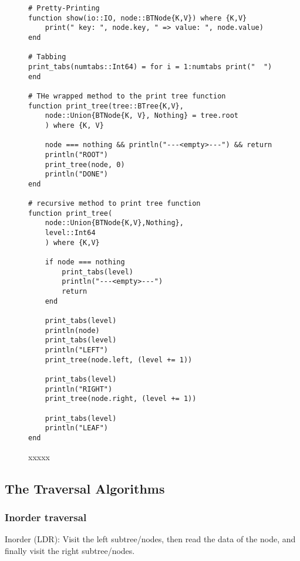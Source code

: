 \documentclass[a4paper, 11pt]{article}
\begin{document}
    \begin{figure}[H]
        \centering
    \begin{verbatim}
# Pretty-Printing
function show(io::IO, node::BTNode{K,V}) where {K,V}
    print(" key: ", node.key, " => value: ", node.value)
end

# Tabbing
print_tabs(numtabs::Int64) = for i = 1:numtabs print("  ") end

# THe wrapped method to the print tree function
function print_tree(tree::BTree{K,V}, 
    node::Union{BTNode{K, V}, Nothing} = tree.root
    ) where {K, V}

    node === nothing && println("---<empty>---") && return
    println("ROOT")
    print_tree(node, 0)
    println("DONE")
end

# recursive method to print tree function
function print_tree(
    node::Union{BTNode{K,V},Nothing}, 
    level::Int64
    ) where {K,V}

    if node === nothing
        print_tabs(level)
        println("---<empty>---")
        return
    end

    print_tabs(level)
    println(node)
    print_tabs(level)
    println("LEFT")
    print_tree(node.left, (level += 1))

    print_tabs(level)
    println("RIGHT")
    print_tree(node.right, (level += 1))

    print_tabs(level)
    println("LEAF")
end
    \end{verbatim}
    \caption{xxxxx}
    \label{code:print}
    \end{figure}

    \subsection*{The Traversal Algorithms}
    \label{sec:treetraversal}

    \subsubsection*{Inorder traversal}
    Inorder (LDR): Visit the left subtree/nodes, then read the data of the node,
    and finally visit the right subtree/nodes.


\end{document}
